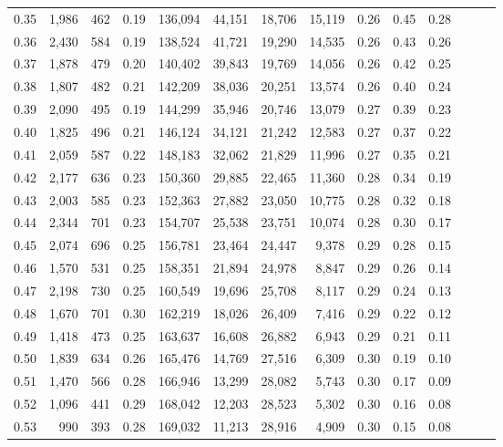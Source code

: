 \begin{tabular}{rrrrrrrrrrrrrr}
0.35 &  1,986 &  462 &  0.19 &  136,094 &   44,151 &  18,706 &  15,119 &  0.26 &  0.45 &      0.28 \\
0.36 &  2,430 &  584 &  0.19 &  138,524 &   41,721 &  19,290 &  14,535 &  0.26 &  0.43 &      0.26 \\
0.37 &  1,878 &  479 &  0.20 &  140,402 &   39,843 &  19,769 &  14,056 &  0.26 &  0.42 &      0.25 \\
0.38 &  1,807 &  482 &  0.21 &  142,209 &   38,036 &  20,251 &  13,574 &  0.26 &  0.40 &      0.24 \\
0.39 &  2,090 &  495 &  0.19 &  144,299 &   35,946 &  20,746 &  13,079 &  0.27 &  0.39 &      0.23 \\
0.40 &  1,825 &  496 &  0.21 &  146,124 &   34,121 &  21,242 &  12,583 &  0.27 &  0.37 &      0.22 \\
0.41 &  2,059 &  587 &  0.22 &  148,183 &   32,062 &  21,829 &  11,996 &  0.27 &  0.35 &      0.21 \\
0.42 &  2,177 &  636 &  0.23 &  150,360 &   29,885 &  22,465 &  11,360 &  0.28 &  0.34 &      0.19 \\
0.43 &  2,003 &  585 &  0.23 &  152,363 &   27,882 &  23,050 &  10,775 &  0.28 &  0.32 &      0.18 \\
0.44 &  2,344 &  701 &  0.23 &  154,707 &   25,538 &  23,751 &  10,074 &  0.28 &  0.30 &      0.17 \\
0.45 &  2,074 &  696 &  0.25 &  156,781 &   23,464 &  24,447 &   9,378 &  0.29 &  0.28 &      0.15 \\
0.46 &  1,570 &  531 &  0.25 &  158,351 &   21,894 &  24,978 &   8,847 &  0.29 &  0.26 &      0.14 \\
0.47 &  2,198 &  730 &  0.25 &  160,549 &   19,696 &  25,708 &   8,117 &  0.29 &  0.24 &      0.13 \\
0.48 &  1,670 &  701 &  0.30 &  162,219 &   18,026 &  26,409 &   7,416 &  0.29 &  0.22 &      0.12 \\
0.49 &  1,418 &  473 &  0.25 &  163,637 &   16,608 &  26,882 &   6,943 &  0.29 &  0.21 &      0.11 \\
0.50 &  1,839 &  634 &  0.26 &  165,476 &   14,769 &  27,516 &   6,309 &  0.30 &  0.19 &      0.10 \\
0.51 &  1,470 &  566 &  0.28 &  166,946 &   13,299 &  28,082 &   5,743 &  0.30 &  0.17 &      0.09 \\
0.52 &  1,096 &  441 &  0.29 &  168,042 &   12,203 &  28,523 &   5,302 &  0.30 &  0.16 &      0.08 \\
0.53 &    990 &  393 &  0.28 &  169,032 &   11,213 &  28,916 &   4,909 &  0.30 &  0.15 &      0.08 \\

\end{tabular}
